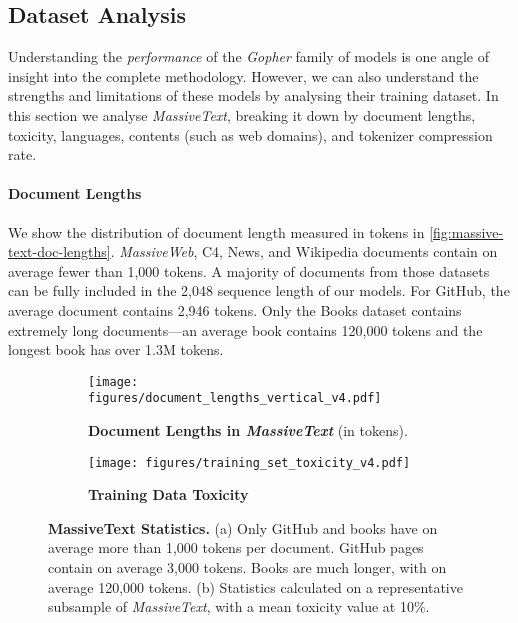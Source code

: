 \documentclass[11pt, a4paper, logo, internal, copyright, nonumbering]{deepmind}
\newcommand{\massivetext}{\textit{MassiveText}\xspace}
\newcommand{\massiveweb}{\textit{MassiveWeb}\xspace}
\newcommand{\gopher}{\textit{Gopher}\xspace}
\begin{document}
\subsection{Dataset Analysis}
\label{sec:dataset-analysis}
Understanding the \textit{performance} of the \gopher family of models is one angle of insight into the complete methodology. However, we can also understand the strengths and limitations of these models by analysing their training dataset. 
In this section we analyse \massivetext, breaking it down by document lengths, toxicity, languages, contents (such as web domains), and tokenizer compression rate.

\paragraph{Document Lengths}
We show the distribution of document length measured in tokens in \autoref{fig:massive-text-doc-lengths}. \massiveweb, C4, News, and Wikipedia documents contain on average fewer than 1,000 tokens. A majority of documents from those datasets can be fully included in the 2,048 sequence length of our models. For GitHub, the average document contains 2,946 tokens. Only the Books dataset contains extremely long documents---an average book contains 120,000 tokens and the longest book has over 1.3M tokens.

\begin{figure}[h]
\begin{subfigure}{0.5\textwidth}
    \centering
    \texttt{[image: figures/document\_lengths\_vertical\_v4.pdf]}
    \caption{\textbf{Document Lengths in \massivetext} (in tokens).}
    \label{fig:massive-text-doc-lengths}
\end{subfigure}
\begin{subfigure}{0.5\textwidth}
        \centering
        \texttt{[image: figures/training\_set\_toxicity\_v4.pdf]}
    \caption{\textbf{Training Data Toxicity}}
            \label{fig:train_data_toxicity_histogram}
\end{subfigure}
\caption{\textbf{MassiveText Statistics.} (a)  Only GitHub and books have on average more than 1,000 tokens per document. GitHub pages contain on average 3,000 tokens. Books are much longer, with on average 120,000 tokens. (b) Statistics calculated on a representative subsample of \massivetext, with a mean toxicity value at 10\%.}
\end{figure}
\end{document}
